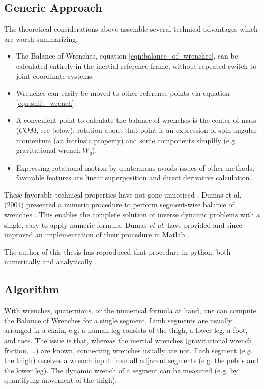 \subsection{Generic Approach}
\label{sec:org8d9ed34}
The theoretical considerations above assemble several technical advantages which are worth summarizing.
\begin{itemize}
\item The Balance of Wrenches, equation \eqref{eqn:balance_of_wrenches}, can be calculated entirely in the inertial reference frame, without repeated switch to joint coordinate systems.
\item Wrenches can easily be moved to other reference points via equation \eqref{eqn:shift_wrench}.
\item A convenient point to calculate the balance of wrenches is the center of mass (\(COM\), see below); rotation about that point is an expression of spin angular momentum (an intrinsic property) and some components simplify (e.g. gravitational wrench \(W_{g}\)).
\item Expressing rotational motion by quaternions avoids issues of other methods; favorable features are linear superposition and direct derivative calculation.
\end{itemize}

These favorable technical properties have not gone unnoticed \citep{Dumas2004,Dumas2007}.
Dumas et al. (2004) presented a numeric procedure to perform segment-wise balance of wrenches \citep[equation 15 in][]{Dumas2004}.
This enables the complete solution of inverse dynamic problems with a single, easy to apply numeric formula.
Dumas \emph{et al.} have provided and since improved an implementation of their procedure in Matlab \citep{DumasMatlab}.


The author of this thesis has reproduced that procedure in python, both numerically and analytically \citep{Mielke2021id}.


\subsection{Algorithm}
\label{sec:orgceef08b}
With wrenches, quaternions, or the numerical formula at hand, one can compute the Balance of Wrenches for a single segment.
Limb segments are usually arranged in a chain, e.g. a human leg consists of the thigh, a lower leg, a foot, and toes.
The issue is that, whereas the inertial wrenches (gravitational wrench, friction, \ldots{}) are known, connecting wrenches usually are not.
Each segment (e.g. the thigh) receives a wrench input from all adjacent segments (e.g. the pelvis and the lower leg).
The dynamic wrench of a segment can be measured (e.g. by quantifying movement of the thigh).

